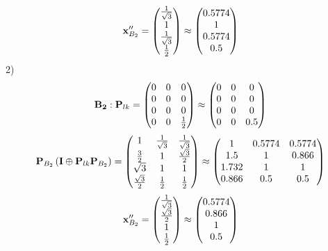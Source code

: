 \documentclass[10pt,a4paper]{article}
\begin{document}
	\[
		\bold{x}''_{B_2} = 
		\begin{pmatrix}
			\frac{1} {\sqrt{3}} \\
			{1} {} \\
			\frac{1} {\sqrt{3}} \\
			\frac{1} {{2}} \\
		\end{pmatrix}
		\approx
		\begin{pmatrix}
			0.5774   \\
			1        \\
			0.5774   \\
			0.5      \\
		\end{pmatrix}
	\]
	2)
	\[
		\bold{B_2}: \bold{P}_{lk} = 
		\begin{pmatrix}
			{{0}} {} & {{0}} {} & {{0}} {} \\
			{{0}} {} & {{0}} {} & {{0}} {} \\
			{{0}} {} & {{0}} {} & {{0}} {} \\
			{{0}} {} & {{0}} {} & \frac{1} {{2}} \\
		\end{pmatrix}
		\approx
		\begin{pmatrix}
			0        & 0        & 0        \\
			0        & 0        & 0        \\
			0        & 0        & 0        \\
			0        & 0        & 0.5      \\
		\end{pmatrix}
	\]
	\[
		\bold{P}_{B_2}\left(\bold{I} \oplus \bold{P}_{lk}\bold{P}_{B_2}\right) = 
		\begin{pmatrix}
			{1} {} & \frac{1} {\sqrt{3}} & \frac{1} {\sqrt{3}} \\
			\frac{{3}} {{2}} & {1} {} & \frac{\sqrt{3}} {{2}} \\
			{\sqrt{3}} {} & {1} {} & {1} {} \\
			\frac{\sqrt{3}} {{2}} & \frac{1} {{2}} & \frac{1} {{2}} \\
		\end{pmatrix}
		\approx
		\begin{pmatrix}
			1        & 0.5774   & 0.5774   \\
			1.5      & 1        & 0.866    \\
			1.732    & 1        & 1        \\
			0.866    & 0.5      & 0.5      \\
		\end{pmatrix}
	\]
	\[
		\bold{x}''_{B_2} = 
		\begin{pmatrix}
			\frac{1} {\sqrt{3}} \\
			\frac{\sqrt{3}} {{2}} \\
			{1} {} \\
			\frac{1} {{2}} \\
		\end{pmatrix}
		\approx
		\begin{pmatrix}
			0.5774   \\
			0.866    \\
			1        \\
			0.5      \\
		\end{pmatrix}
	\]

\end{document}
